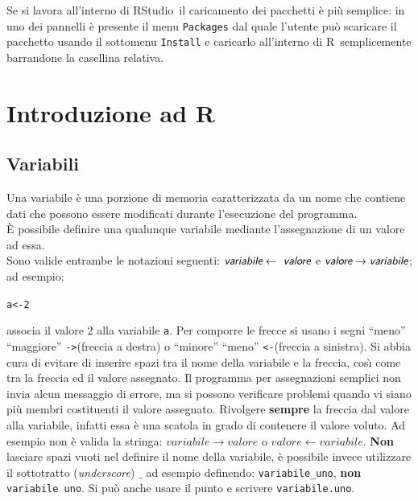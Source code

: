 \documentclass[onecolumn,11pt]{book}\usepackage[]{graphicx}\usepackage[]{color}
\makeatletter
\newcommand{\hlnum}[1]{\textcolor[rgb]{0.686,0.059,0.569}{#1}}%
\newcommand{\hlstd}[1]{\textcolor[rgb]{0.345,0.345,0.345}{#1}}%
\newcommand{\hlkwb}[1]{\textcolor[rgb]{0.69,0.353,0.396}{#1}}%
\newenvironment{kframe}{%
 \def\at@end@of@kframe{}%
 \ifinner\ifhmode%
  \def\at@end@of@kframe{\end{minipage}}%
  \begin{minipage}{\columnwidth}%
 \fi\fi%
 \def\FrameCommand##1{\hskip\@totalleftmargin \hskip-\fboxsep
 \colorbox{shadecolor}{##1}\hskip-\fboxsep
     \hskip-\linewidth \hskip-\@totalleftmargin \hskip\columnwidth}%
 \MakeFramed {\advance\hsize-\width
   \@totalleftmargin\z@ \linewidth\hsize
   \@setminipage}}%
 {\par\unskip\endMakeFramed%
 \at@end@of@kframe}
\newenvironment{knitrout}{}{} %
\newcommand{\varia}[1]{\textsl{\textsf{#1}}}
\newcommand{\rst}{\textsf{RStudio}~}
\newcommand{\rpr}{\textsf{R}~}
\makeatother
\begin{document}
Se si lavora all'interno di \rst il caricamento dei pacchetti \`e pi\`u semplice: in uno dei pannelli \`e presente il menu \texttt{Packages} dal quale l'utente pu\`o scaricare il pacchetto usando il sottomenu \texttt{Install} e caricarlo all'interno di \rpr semplicemente barrandone la casellina relativa.

\chapter{Introduzione ad \rpr}

\section{Variabili}
Una variabile \`e una porzione di memoria caratterizzata da un nome che contiene dati che possono essere modificati durante l'esecuzione del programma.\\ \`E  possibile definire una qualunque variabile mediante l'assegnazione di un valore ad essa.\\
Sono valide entrambe le notazioni seguenti:
$ \varia{variabile}\leftarrow\varia{ valore}$ e
$\varia{valore} \to  \varia{variabile}$;
ad esempio:
\begin{knitrout}
\color{fgcolor}\begin{kframe}
\begin{alltt}
\hlstd{a}\hlkwb{<-}\hlnum{2}
\end{alltt}
\end{kframe}
\end{knitrout}
associa il valore $2$ alla variabile \texttt{a}. Per comporre le frecce si usano i segni ``meno'' ``maggiore''  \texttt{->}(freccia a destra) o ``minore'' ``meno''  \texttt{<-}(freccia a sinistra).
Si abbia cura di evitare di inserire spazi tra il nome della variabile e la freccia, cos\`\i \; come tra la freccia ed il valore assegnato. Il programma per assegnazioni semplici non invia  alcun messaggio di errore, ma si possono verificare problemi quando vi siano pi\`u membri costituenti il valore assegnato.
Rivolgere {\bf sempre} la freccia dal valore alla variabile, infatti essa \`e una scatola in grado di contenere il valore voluto. Ad esempio non \`e valida la stringa:
$variabile\rightarrow valore $ o $ valore\leftarrow variabile$.
{\bf Non} lasciare spazi vuoti nel definire il nome della variabile, \`e possibile invece utilizzare  il sottotratto (\textit{underscore}) $\_$  ad esempio definendo: \texttt{variabile\_uno}, {\bf non} \texttt{variabile uno}. Si pu\`o anche usare il punto e scrivere  \texttt{variabile.uno}.
\end{document}
